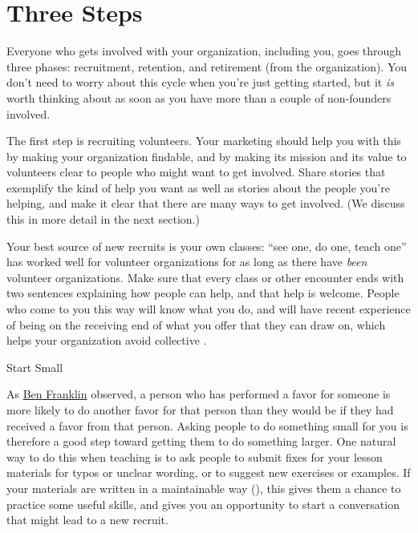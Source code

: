 \section{Three Steps}\label{s:community-three-steps}

Everyone who gets involved with your organization, including you, goes
through three phases: recruitment, retention, and retirement (from the
organization). You don't need to worry about this cycle when you're just
getting started, but it \emph{is} worth thinking about as soon as you
have more than a couple of non-founders involved.

The first step is recruiting volunteers. Your marketing should help
you with this by making your organization findable, and by making its
mission and its value to volunteers clear to people who might want to
get involved. Share stories that exemplify the kind of help you want
as well as stories about the people you're helping, and make it clear
that there are many ways to get involved. (We discuss this in more
detail in the next section.)

Your best source of new recruits is your own classes: ``see one, do one,
teach one'' has worked well for volunteer organizations for as long as
there have \emph{been} volunteer organizations. Make sure that every
class or other encounter ends with two sentences explaining how people
can help, and that help is welcome. People who come to you this way will
know what you do, and will have recent experience of being on the
receiving end of what you offer that they can draw on, which helps your
organization avoid collective
.

\begin{callout}{Start Small}

  As \href{https://en.wikipedia.org/wiki/Ben\_Franklin\_effect}{Ben
    Franklin} observed, a person who has performed a favor for someone
  is more likely to do another favor for that person than they would
  be if they had received a favor from that person. Asking people to
  do something small for you is therefore a good step toward getting
  them to do something larger. One natural way to do this when
  teaching is to ask people to submit fixes for your lesson materials
  for typos or unclear wording, or to suggest new exercises or
  examples. If your materials are written in a maintainable way
  (), this gives them a chance to
  practice some useful skills, and gives you an opportunity to start a
  conversation that might lead to a new recruit.

\end{callout}

